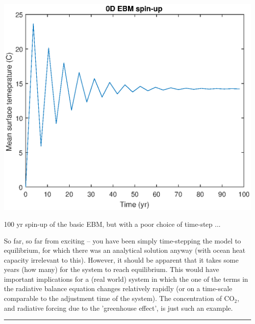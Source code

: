 \documentclass{tufte-book} %
\begin{document}

\begin{marginfigure}[-2.0in]
\includegraphics[width=\linewidth]{ch4-ebm-model2.eps}
\caption{100 yr spin-up of the basic EBM, but with a poor choice of time-step ...}
\label{fig:ch4-ebm-model2}
\end{marginfigure}

So far, so far from exciting -- you have been simply time-stepping the model to equilibrium, for which there was an analytical solution anyway (with ocean heat capacity irrelevant to this). However, it should be apparent that it takes some years (how many) for the system to reach equilibrium. This would have important implications for a (real world) system in which the one of the terms in the radiative balance equation changes relatively rapidly (or on a time-scale comparable to the adjustment time of the system). The concentration of CO\(_{2}\), and radiative forcing due to the 'greenhouse effect', is just such an example.

\vspace{1mm}
\noindent\rule{4cm}{0.5pt}
\vspace{-2mm}
\end{document}
